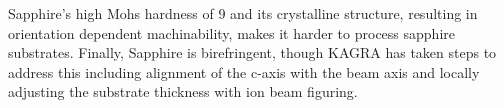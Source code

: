Sapphire's high Mohs hardness of 9 and its crystalline structure, resulting in orientation dependent machinability, makes it harder to process sapphire substrates. 
Finally, Sapphire is birefringent, though KAGRA has taken steps to address this including alignment of the c-axis with the beam axis and locally adjusting the substrate thickness with ion beam figuring.  




